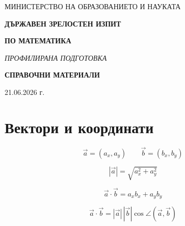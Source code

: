 \documentclass[12pt,a4paper]{article}
\begin{document}
\begin{titlepage}
\centering
\vspace*{1.5cm}

{\large МИНИСТЕРСТВО НА ОБРАЗОВАНИЕТО И НАУКАТА\par}

\vspace{3.2cm}


\vspace{0.8cm}
{\Huge\bfseries\color{titleblue} ДЪРЖАВЕН ЗРЕЛОСТЕН ИЗПИТ\par}
\vspace{0.4cm}
{\Huge\bfseries\color{titleblue} ПО МАТЕМАТИКА\par}

\vspace{1cm}
{\LARGE\itshape ПРОФИЛИРАНА ПОДГОТОВКА\par}

\vspace{0.8cm}

\vspace{1.6cm}
{\Large\bfseries СПРАВОЧНИ МАТЕРИАЛИ\par}

\vfill

\vspace{2cm}

{\normalsize 21.06.2026 г.\par}

\vspace{1cm}

\end{titlepage}

\tableofcontents
\newpage

\section{Вектори и координати}

$$\vec{a} = (a_x, a_y) \qquad \vec{b} = (b_x, b_y)$$

$$|\vec{a}| = \sqrt{a_x^2 + a_y^2}$$

$$\vec{a} \cdot \vec{b} = a_x b_x + a_y b_y$$

$$\vec{a} \cdot \vec{b} = |\vec{a}|\,|\vec{b}|\cos\angle(\vec{a}, \vec{b})$$
\end{document}
